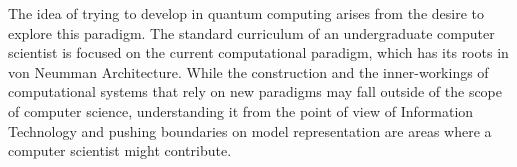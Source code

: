 The idea of trying to develop in quantum computing arises from the desire to explore this paradigm. The standard curriculum of an undergraduate computer scientist is focused on the current computational paradigm, which has its roots in von Neumman Architecture\cite{neumann45edvac}. While the construction and the inner-workings of computational systems that rely on new paradigms may fall outside of the scope of computer science, understanding it from the point of view of Information Technology and pushing boundaries on model representation are areas where a computer scientist might contribute.


